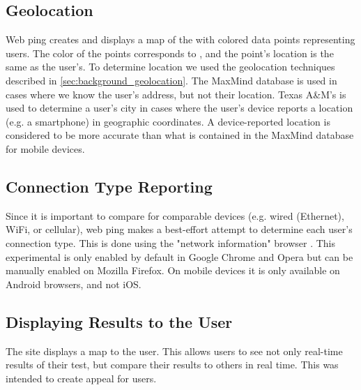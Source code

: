 \subsection{Geolocation}
Web ping creates and displays a map of the \us with colored data points representing users. The color of the points corresponds to \rtt, and the point's location is the same as the user's. To determine location we used the geolocation techniques described in \cref{sec:background_geolocation}. The MaxMind database is used in cases where we know the user's \ip address, but not their location. Texas A\&M's \api is used to determine a user's city in cases where the user's device reports a location (e.g. a smartphone) in geographic coordinates. A device-reported location is considered to be more accurate than what is contained in the MaxMind database for mobile devices. 

\subsection{Connection Type Reporting}
Since it is important to compare \rtts for comparable devices (e.g. wired (Ethernet), WiFi, or cellular), web ping makes a best-effort attempt to determine each user's connection type. This is done using the "network information" browser \api. This experimental \api is only enabled by default in Google Chrome and Opera but can be manually enabled on Mozilla Firefox. On mobile devices it is only available on Android browsers, and not iOS.

\subsection{Displaying Results to the User}
The site displays a map to the user. This allows users to see not only real-time results of their test, but compare their results to others in real time. This was intended to create appeal for users.
